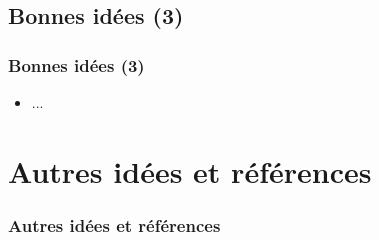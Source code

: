 \documentclass[slidetop,11pt]{beamer}
\begin{document}
\subsection{Bonnes id{\'e}es (3)}
\begin{frame}
	\frametitle{Bonnes id{\'e}es (3)}
	\begin{itemize}
		\item ...
	\end{itemize} 
\end{frame}


\section{Autres id{\'e}es et r{\'e}f{\'e}rences}
\begin{frame}
	\frametitle{Autres id{\'e}es et r{\'e}f{\'e}rences}
	\tableofcontents[sections=4,currentsection,subsectionstyle=show/shaded/hide] %
\end{frame}
\end{document}
